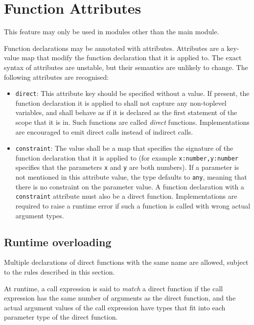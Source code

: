 \section{Function Attributes}

This feature may only be used in modules other than the main module.

Function declarations may be annotated with attributes.  Attributes are a key-value map that modify the function declaration that it is applied to.  The exact syntax of attributes are unstable, but their semantics are unlikely to change.  The following attributes are recognised:

\begin{itemize}

\item \lstinline{direct}:  This attribute key should be specified without a value.  If present, the function declaration it is applied to shall not capture any non-toplevel variables, and shall behave as if it is declared as the first statement of the scope that it is in.  Such functions are called \textit{direct} functions.  Implementations are encouraged to emit direct calls instead of indirect calls.

\item \lstinline{constraint}:  The value shall be a map that specifies the signature of the function declaration that it is applied to (for example \lstinline{x:number,y:number} specifies that the parameters \lstinline{x} and \lstinline{y} are both numbers).  If a parameter is not mentioned in this attribute value, the type defaults to \lstinline{any}, meaning that there is no constraint on the parameter value.  A function declaration with a \lstinline{constraint} attribute must also be a direct function.  Implementations are required to raise a runtime error if such a function is called with wrong actual argument types.

\end{itemize}

\subsection*{Runtime overloading}

Multiple declarations of direct functions with the same name are allowed, subject to the rules described in this section.

At runtime, a call expression is said to \textit{match} a direct function if the call expression has the same number of arguments as the direct function, and the actual argument values of the call expression have types that fit into each parameter type of the direct function.

